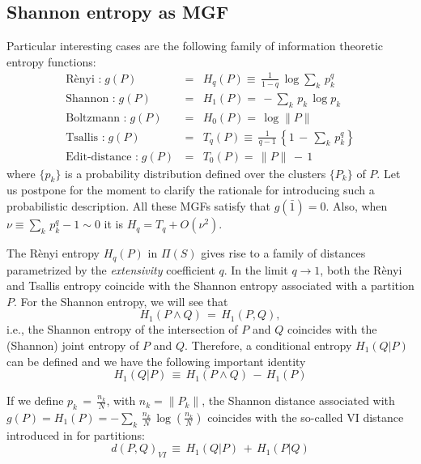 \documentclass[twocolumn,aps,sort,nofootinbib]{revtex4}
\begin{document}
\begin{appendix}
\subsection{Shannon entropy as MGF}
Particular interesting cases are the following 
family of information theoretic entropy functions:
\begin{eqnarray*}
\text{R\`enyi :}\; g(P)\,&=&H_q(P)\equiv\,\frac{1}{1-q}\,\log \sum_k\,p_k^q \\
\text{Shannon :}\; g(P)\,&=&H_1(P)=\,-\sum_k\,p_k\,\log p_k\\
\text{Boltzmann :}\; g(P)\,&=&H_0(P)=\,\log \|P\| \\
\text{Tsallis :}\; g(P)\,&=&T_q(P)\equiv\,\frac{1}{q-1}\,\left \{ 1\,-\, \sum_k\,p_k^q \right\}\\
\text{Edit-distance :}\; g(P)\,&=&T_0(P)=\,\|P\| \,-\,1 
\end{eqnarray*}
where $\{p_k\}$ is a probability distribution defined over the clusters $\{P_k\}$ of $P$. Let us postpone for the moment
to clarify the rationale for introducing such a probabilistic description. 
All these MGFs satisfy that $g(\bar{1})= 0$.
Also, when $\nu\equiv\sum_k\,p_k^q - 1\sim 0$ it is $H_q = T_q + O(\nu^2)$.

The R\`enyi entropy
$H_q(P)$ in $\Pi(S)$ gives rise to a family of distances parametrized by the
{\sl extensivity} coefficient $q$. 
In the limit $q\rightarrow 1$, both the R\`enyi and Tsallis entropy
coincide with the Shannon entropy associated with a partition $P$. 
For the Shannon entropy,
we will see that 
\begin{equation}
H_1(P\wedge Q) \,=\,H_1(P,Q),
\end{equation}
i.e., the Shannon entropy of the intersection of $P$ and $Q$ coincides with the 
(Shannon) joint entropy of $P$ and $Q$. Therefore, a conditional entropy $H_1(Q|P)$ can
be defined and we have the following important
identity
\begin{equation}
H_1(Q|P)\,\equiv\,H_1(P\wedge Q)\,-\,H_1(P)
\end{equation}

If we define $p_k\,=\,\frac{n_k}{N}$, with $n_k=\|P_k\|$,  the Shannon distance associated with 
$g(P)=H_1(P)=-\sum_k\,\frac{n_k}{N}\,\log(\frac{n_k}{N})$
coincides with the so-called VI distance introduced in \cite{MMeila03} for partitions:
\begin{equation}
d(P,Q)_{VI}\,\equiv\,H_1(Q|P)\,+\,H_1(P|Q)
\end{equation}


\end{appendix}
\end{document}
